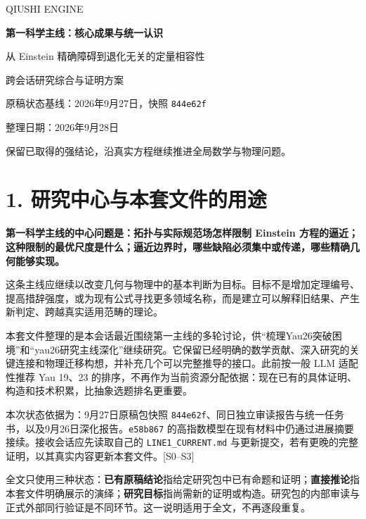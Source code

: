 \documentclass[UTF8,a4paper,11pt,fontset=fandol]{ctexart}
\begin{document}
\begin{titlepage}
\thispagestyle{empty}
\vspace*{2cm}
{\large\sffamily QIUSHI ENGINE\par}
\vspace{1.3cm}
{\Huge\bfseries 第一科学主线：核心成果与统一认识\par}
\vspace{0.8cm}
{\Large 从 Einstein 精确障碍到退化无关的定量相容性\par}
\vspace{1.2cm}
{\large 跨会话研究综合与证明方案\par}
\vfill
{\normalsize 原稿状态基线：2026年9月27日，快照 \texttt{844e62f}\par}
\vspace{0.35cm}
{\normalsize 整理日期：2026年9月28日\par}
\vspace{1cm}
{\small 保留已取得的强结论，沿真实方程继续推进全局数学与物理问题。\par}
\end{titlepage}
\tableofcontents
\clearpage
\section{1.
研究中心与本套文件的用途}\label{ux7814ux7a76ux4e2dux5fc3ux4e0eux672cux5957ux6587ux4ef6ux7684ux7528ux9014}

\textbf{第一科学主线的中心问题是：拓扑与实际规范场怎样限制 Einstein
方程的逼近；这种限制的最优尺度是什么；逼近边界时，哪些缺陷必须集中或传递，哪些精确几何能够实现。}

这条主线应继续以改变几何与物理中的基本判断为目标。目标不是增加定理编号、提高措辞强度，或为现有公式寻找更多领域名称，而是建立可以解释旧结果、产生新判定、跨越真实适用范畴的理论。

本套文件整理的是本会话最近围绕第一主线的多轮讨论，供``梳理Yau26突破困境''和``yau26研究主线深化''继续研究。它保留已经明确的数学贡献、深入研究的关键连接和物理迁移构想，并补充几个可以完整推导的接口。此前按一般
LLM 适配性推荐 Yau 19、23
的排序，不再作为当前资源分配依据：现在已有的具体证明、构造和技术积累，比抽象选题排名更重要。

本次状态依据为：9月27日原稿包快照
\texttt{844e62f}、同日独立审读报告与统一任务书，以及9月26日深化报告。\texttt{e58b867}
的高指数模型在现有材料中仍通过进展摘要接续。接收会话应先读取自己的
\texttt{LINE1\_CURRENT.md}
与更新提交，若有更晚的完整证明，以其真实内容更新本套文件。{[}S0--S3{]}

全文只使用三种状态：\textbf{已有原稿结论}指给定研究包中已有命题和证明；\textbf{直接推论}指本套文件明确展示的演绎；\textbf{研究目标}指尚需新的证明或构造。研究包的内部审读与正式外部同行验证是不同环节。这一说明适用于全文，不再逐段重复。
\end{document}
